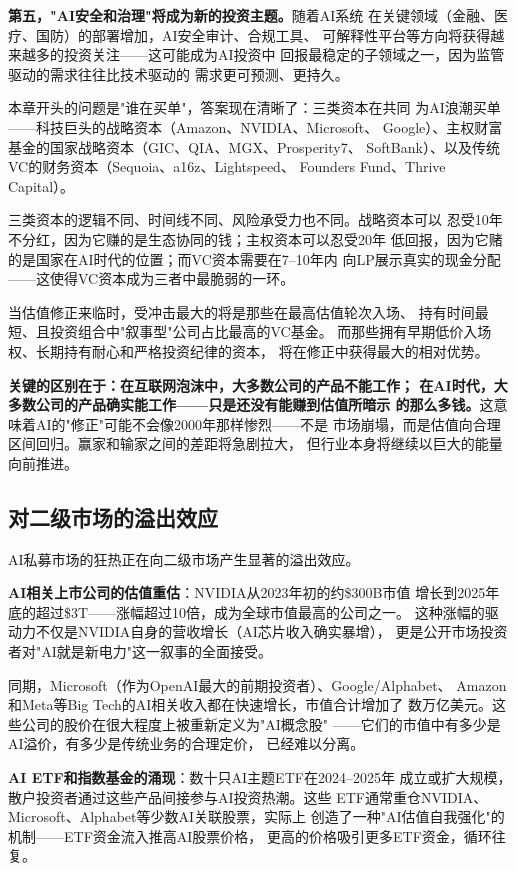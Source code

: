 \textbf{第五，"AI安全和治理"将成为新的投资主题。}随着AI系统
在关键领域（金融、医疗、国防）的部署增加，AI安全审计、合规工具、
可解释性平台等方向将获得越来越多的投资关注——这可能成为AI投资中
回报最稳定的子领域之一，因为监管驱动的需求往往比技术驱动的
需求更可预测、更持久。

\bigskip

本章开头的问题是"谁在买单"，答案现在清晰了：三类资本在共同
为AI浪潮买单——科技巨头的战略资本（Amazon、NVIDIA、Microsoft、
Google）、主权财富基金的国家战略资本（GIC、QIA、MGX、Prosperity7、
SoftBank）、以及传统VC的财务资本（Sequoia、a16z、Lightspeed、
Founders Fund、Thrive Capital）。

三类资本的逻辑不同、时间线不同、风险承受力也不同。战略资本可以
忍受10年不分红，因为它赚的是生态协同的钱；主权资本可以忍受20年
低回报，因为它赌的是国家在AI时代的位置；而VC资本需要在7--10年内
向LP展示真实的现金分配——这使得VC资本成为三者中最脆弱的一环。

当估值修正来临时，受冲击最大的将是那些在最高估值轮次入场、
持有时间最短、且投资组合中"叙事型"公司占比最高的VC基金。
而那些拥有早期低价入场权、长期持有耐心和严格投资纪律的资本，
将在修正中获得最大的相对优势。

\textbf{关键的区别在于：在互联网泡沫中，大多数公司的产品不能工作；
在AI时代，大多数公司的产品确实能工作——只是还没有能赚到估值所暗示
的那么多钱。}这意味着AI的"修正"可能不会像2000年那样惨烈——不是
市场崩塌，而是估值向合理区间回归。赢家和输家之间的差距将急剧拉大，
但行业本身将继续以巨大的能量向前推进。

\subsection{对二级市场的溢出效应}
\label{subsec:fund-secondary}

AI私募市场的狂热正在向二级市场产生显著的溢出效应。

\textbf{AI相关上市公司的估值重估}：NVIDIA从2023年初的约\$300B市值
增长到2025年底的超过\$3T——涨幅超过10倍，成为全球市值最高的公司之一。
这种涨幅的驱动力不仅是NVIDIA自身的营收增长（AI芯片收入确实暴增），
更是公开市场投资者对"AI就是新电力"这一叙事的全面接受。

同期，Microsoft（作为OpenAI最大的前期投资者）、Google/Alphabet、
Amazon和Meta等Big Tech的AI相关收入都在快速增长，市值合计增加了
数万亿美元。这些公司的股价在很大程度上被重新定义为"AI概念股"
——它们的市值中有多少是AI溢价，有多少是传统业务的合理定价，
已经难以分离。

\textbf{AI ETF和指数基金的涌现}：数十只AI主题ETF在2024--2025年
成立或扩大规模，散户投资者通过这些产品间接参与AI投资热潮。这些
ETF通常重仓NVIDIA、Microsoft、Alphabet等少数AI关联股票，实际上
创造了一种"AI估值自我强化"的机制——ETF资金流入推高AI股票价格，
更高的价格吸引更多ETF资金，循环往复。

